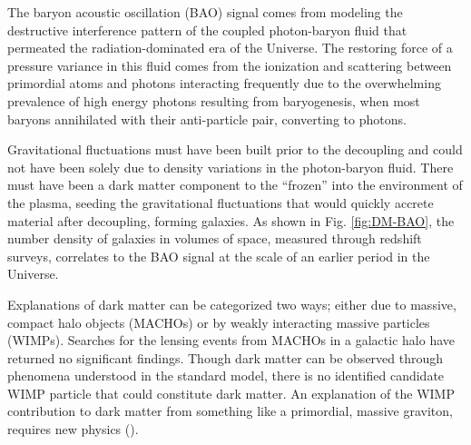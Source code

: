 \documentclass{paper}
\begin{document}
  The baryon acoustic oscillation (BAO) signal comes from modeling the destructive
  interference pattern of the coupled photon-baryon fluid that permeated the
  radiation-dominated era of the Universe. The restoring force of a pressure
  variance in this fluid comes from the ionization and scattering between
  primordial atoms and photons interacting frequently due to the overwhelming
  prevalence of high energy photons resulting from baryogenesis, when most 
  baryons annihilated with their anti-particle pair, converting to photons.

  Gravitational fluctuations must have been built prior to the decoupling and 
  could not have been solely due to density variations in the photon-baryon 
  fluid.  There must have been a dark matter component to the ``frozen'' into 
  the environment of the plasma, seeding the gravitational fluctuations that 
  would quickly accrete material after decoupling, forming galaxies.
  As shown in Fig. \ref{fig:DM-BAO}, the number 
  density of galaxies in volumes of space, measured through redshift surveys, 
  correlates to the BAO signal at the scale of an earlier period in the 
  Universe.

  

  Explanations of dark matter can be categorized two ways; either due to 
  massive, compact halo objects (MACHOs) or by weakly interacting massive 
  particles (WIMPs). Searches for the lensing events from MACHOs in a galactic 
  halo have returned no significant findings. Though dark matter can be 
  observed through phenomena understood in the standard model, there is 
  no identified candidate WIMP particle that could constitute dark matter. An 
  explanation of the WIMP contribution to dark matter from something like a 
  primordial, massive graviton, requires new physics 
  (\cite{PhysRevLett.128.081806}).
\end{document}

